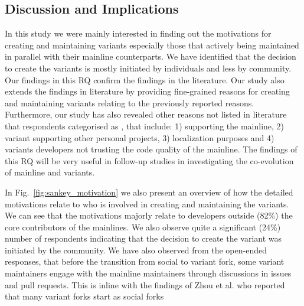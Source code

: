 \subsection{Discussion and Implications}
In this study we were mainly interested in finding out the motivations for creating and maintaining variants especially those that actively being maintained in parallel with their mainline counterparts.
We have identified that the decision to create the variants is mostly initiated by individuals and less by community.
Our findings in this RQ confirm the findings in the literature.
Our study also extends the findings in literature by providing fine-grained reasons for creating and maintaining variants relating to the previously reported reasons.
Furthermore, our study has also revealed other reasons not listed in literature that respondents categorised as , that include: 1) supporting the mainline, 2) variant supporting other personal projects, 3) localization purposes and 4) variants developers not trusting the code quality of the mainline.
The findings of this RQ will be very useful in follow-up studies in investigating the co-evolution of mainline and variants.

In Fig.~\ref{fig:sankey_motivation} we also present an overview of how the detailed motivations relate to who is involved in creating and maintaining the variants. We can see that the motivations majorly relate to developers outside (82\%) the core contributors of the mainlines. We also observe quite a significant (24\%) number of respondents indicating that the decision to create the variant was initiated by the community. We have also observed from the open-ended responses, that before the transition from social to variant fork, some variant maintainers engage with the mainline maintainers through discussions in issues and pull requests. This is inline with the findings of Zhou et al. who reported that many variant forks start as social forks~\cite{Zhou:2020}

